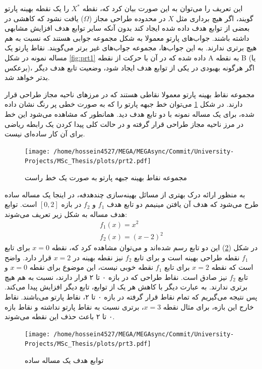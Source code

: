 \documentclass[a4paper,titlepage,12pt,fleqn,oneside]{report}
\begin{document}
	این تعریف را می‌توان به این صورت بیان کرد که، نقطه $X^{*}$ را یک نقطه بهینه پارتو گویند، اگر هیچ برداری مثل $X$ در محدوده طراحی مجاز ($\Omega$) یافت نشود که کاهشی در بعضی از توابع هدف داده شده ایجاد کند بدون آنکه سایر توابع هدف افزایش مشابهی داشته باشند. جواب‌های پارتو معمولا به شکل مجموعه جوابی هستند که نسبت به هم هیچ برتری ندارند. به این جواب‌ها، مجموعه جواب‌های غیر برتر می‌گویند. نقاط پارتو یک مساله نمونه در شکل \ref{fig:prt1} داده شده که در آن با حرکت از نقطه A به نقطه B (یا برعکس)، اگر هرگونه بهبودی در یکی از توابع هدف ایجاد شود، وضعیت تابع هدف دیگر بدتر خواهد شد.
	
	مجموعه نقاط بهینه پارتو معمولا نقاطی هستند که در مرز‌های ناحیه مجاز طراحی قرار دارند. در شکل
	\ref{fig:prt2}
	می‌توان خط جبهه پارتو را که به صورت خطی پر رنگ نشان داده شده، برای یک مساله نمونه با دو تابع هدف دید. همانطور که مشاهده می‌شود این خط در مرز ناحیه مجاز طراحی قرار گرفته و در حالت کلی پیدا کردن یک رابطه ریاضی برای آن کار ساده‌ای نیست.
	\begin{figure}[h!]
		\centering
		\texttt{[image: /home/hossein4527/MEGA/MEGAsync/Commit/University-Projects/MSc\_Thesis/plots/prt2.pdf]}
		\caption{مجموعه نقاط بهینه جبهه پارتو به صورت یک خط راست}
		\label{fig:prt2}
	\end{figure}
	به منظور ارائه درک بهتری از مسائل بهینه‌سازی چند‌هدفه، در اینجا یک مساله ساده طرح می‌شود که هدف آن یافتن مینیمم دو تابع هدف $f_{1}$ و $f_{2}$ در بازه $[0,2]$ است. توابع هدف مساله به شکل زیر تعریف می‌شوند:
	\begin{equation}
		\begin{array}{l}
			f_{1}(x)=x^{2} \\
			f_{2}(x)=(x-2)^{2}
		\end{array}
	\end{equation}
	در شکل (\ref{fig:prt3}) این دو تابع رسم شده‌ا‌ند و می‌توان مشاهده کرد که، نقطه $x=0$ برای تابع $f_{1}$ نقطه طراحی بهینه است و برای تابع $f_{2}$ نیز نقطه بهینه در $x=2$ قرار دارد. واضح است که نقطه $x=2$ برای تابع $f_{1}$ نقطه خوبی نیست، این موضوع برای نقطه $x=0$ و تابع $f_{2}$ نیز صادق است. نقاط طراحی که در بازه ۰ تا ۲ قرار دارند، نسبت به هم هیچ برتری ندارند. به عبارت دیگر با کاهش هر یک از توابع، تابع دیگر افزایش پیدا می‌کند. پس نتیجه می‌گیریم که تمام نقاط قرار گرفته در بازه ۰ تا ۲، نقاط پارتو می‌باشند. نقاط خارج این بازه، برای مثال نقطه $x=3$، برتری نسبت به نقاط پارتو نداشته و نقاط بازه ۰ تا ۲ باعث حذف این نقطه می‌شوند.
	\begin{figure}[h!]
		\centering
		\texttt{[image: /home/hossein4527/MEGA/MEGAsync/Commit/University-Projects/MSc\_Thesis/plots/prt3.pdf]}
		\caption{
			توابع هدف یک مساله ساده
		}
		\label{fig:prt3}
	\end{figure}
\end{document}
